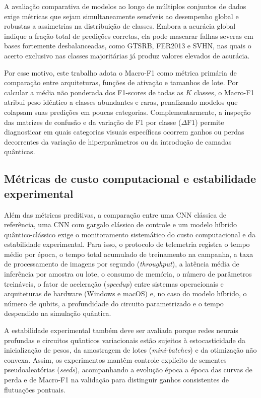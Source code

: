 \documentclass[
    12pt,
    openright,
    oneside,
    a4paper,
    english,
    brazil
]{abntex2}
\begin{document}
A avaliação comparativa de modelos ao longo de múltiplos conjuntos de dados exige métricas que sejam simultaneamente sensíveis ao desempenho global e robustas a assimetrias na distribuição de classes. Embora a acurácia global indique a fração total de predições corretas, ela pode mascarar falhas severas em bases fortemente desbalanceadas, como GTSRB, FER2013 e SVHN, nas quais o acerto exclusivo nas classes majoritárias já produz valores elevados de acurácia.

Por esse motivo, este trabalho adota o Macro-F1 como métrica primária de comparação entre arquiteturas, funções de ativação e tamanhos de lote. Por calcular a média não ponderada dos F1-scores de todas as \(K\) classes, o Macro-F1 atribui peso idêntico a classes abundantes e raras, penalizando modelos que colapsam suas predições em poucas categorias. Complementarmente, a inspeção das matrizes de confusão e da variação de F1 por classe (\(\Delta\text{F1}\)) permite diagnosticar em quais categorias visuais específicas ocorrem ganhos ou perdas decorrentes da variação de hiperparâmetros ou da introdução de camadas quânticas.

\subsection{Métricas de custo computacional e estabilidade experimental}
\label{subsec:metricas_custo_estabilidade}

Além das métricas preditivas, a comparação entre uma CNN clássica de referência, uma CNN com gargalo clássico de controle e um modelo híbrido quântico-clássico exige o monitoramento sistemático do custo computacional e da estabilidade experimental. Para isso, o protocolo de telemetria registra o tempo médio por época, o tempo total acumulado de treinamento na campanha, a taxa de processamento de imagens por segundo (\textit{throughput}), a latência média de inferência por amostra ou lote, o consumo de memória, o número de parâmetros treináveis, o fator de aceleração (\textit{speedup}) entre sistemas operacionais e arquiteturas de hardware (Windows e macOS) e, no caso do modelo híbrido, o número de qubits, a profundidade do circuito parametrizado e o tempo despendido na simulação quântica.

A estabilidade experimental também deve ser avaliada porque redes neurais profundas e circuitos quânticos variacionais estão sujeitos à estocasticidade da inicialização de pesos, da amostragem de lotes (\textit{mini-batches}) e da otimização não convexa. Assim, os experimentos mantêm controle explícito de sementes pseudoaleatórias (\textit{seeds}), acompanhando a evolução época a época das curvas de perda e de Macro-F1 na validação para distinguir ganhos consistentes de flutuações pontuais.
\end{document}
